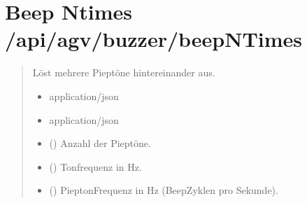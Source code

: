 \documentclass[letterpaper,10pt,english]{sphinxmanual}
\begin{document}
\section{Beep N\sphinxhyphen{}times \sphinxhyphen{} /api/agv/buzzer/beepNTimes}
\label{\detokenize{agv_rest_api_buzzer:beep-n-times-api-agv-buzzer-beepntimes}}\label{\detokenize{agv_rest_api_buzzer:post-api-agv-buzzer-beepntimes}}

\begin{fulllineitems}
\label{\detokenize{agv_rest_api_buzzer:post--api-agv-buzzer-beepNTimes}}
\pysigstartsignatures
\pysigline
{}
\pysigstopsignatures\begin{quote}\begin{description}
\sphinxAtStartPar
Löst mehrere Pieptöne hintereinander aus.

\begin{itemize}
\item {} 
\sphinxAtStartPar
{} \textendash{} application/json

\end{itemize}

\begin{itemize}
\item {} 
\sphinxAtStartPar
{} \textendash{} application/json

\end{itemize}

\begin{itemize}
\item {} 
\sphinxAtStartPar
{} () \textendash{} Anzahl der Pieptöne.

\item {} 
\sphinxAtStartPar
{} () \textendash{} Tonfrequenz in Hz.

\item {} 
\sphinxAtStartPar
{} () \textendash{} Piepton\sphinxhyphen{}Frequenz in Hz (Beep\sphinxhyphen{}Zyklen pro Sekunde).


\end{itemize}
\end{description}
\end{quote}
\end{fulllineitems}
\end{document}

